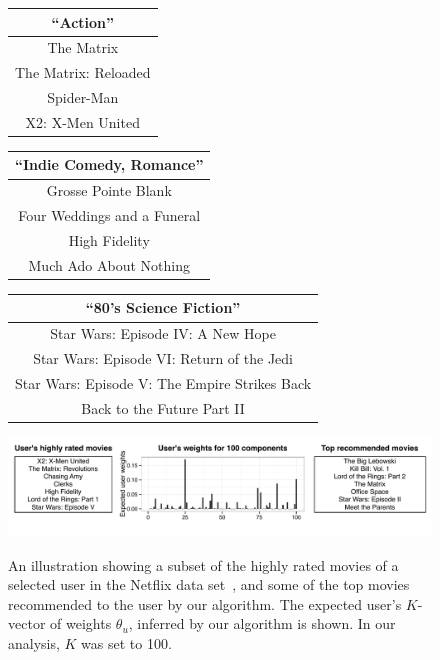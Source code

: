 \begin{figure}[th]
\centering
\vspace{0.1cm}
\small
\begin{tabular}{c}
\toprule
\bf{``Action''}\\
\midrule
The Matrix\\
The Matrix: Reloaded\\
Spider-Man\\
X2: X-Men United\\
\bottomrule
\end{tabular}
\begin{tabular}{c}
\toprule
\bf{``Indie Comedy, Romance''}\\
\midrule
Grosse Pointe Blank\\
Four Weddings and a Funeral\\
High Fidelity\\
Much Ado About Nothing\\
\bottomrule
\end{tabular}
\begin{tabular}{c}
\toprule
\bf{``80's Science Fiction''}\\
\midrule
Star Wars: Episode IV: A New Hope\\
Star Wars: Episode VI: Return of the Jedi\\
Star Wars: Episode V: The Empire Strikes Back\\
Back to the Future Part II\\
\bottomrule
\end{tabular}

\centering
\includegraphics[width=\textwidth]{figures/netflix-exploratory.pdf}\\
\caption{
An illustration showing a subset of the highly rated movies
  of a selected user in the Netflix data set~\cite{Koren:2009}, and
  some of the top movies recommended to the user by our algorithm. The
  expected user's $K$-vector of weights $\theta_u$, inferred by our
  algorithm is shown. In our analysis, $K$ was set to 100.}
\label{fig:netflix-illustration}
\end{figure}

